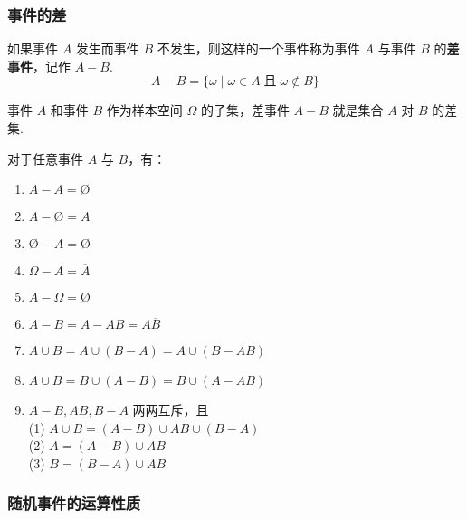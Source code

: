 \subsubsection{事件的差}

如果事件 $A$ 发生而事件 $B$ 不发生，则这样的一个事件称为事件 $A$ 与事件 $B$ 的\textbf{差事件}，记作 $A-B$.
$$
A - B = \{ \omega \mid \omega \in A \;\text{且}\; \omega \notin B \}
$$

事件 $A$ 和事件 $B$ 作为样本空间 $\varOmega$ 的子集，差事件 $A - B$ 就是集合 $A$ 对 $B$ 的差集.

\begin{property}
    \indent 对于任意事件 $A$ 与 $B$，有：
    \begin{enumerate}
        \item $A - A = \text{\O}$
        \item $A - \text{\O} = A$
        \item $\text{\O} - A = \text{\O}$
        \item $\varOmega - A = \overline{A}$
        \item $A - \varOmega = \text{\O}$
        \item $A - B = A - AB = A \overline{B}$
        \item $A \cup B = A \cup (B-A) = A \cup (B-AB)$
        \item $A \cup B = B \cup (A-B) = B \cup (A-AB)$
        \item $A-B, AB, B-A$ 两两互斥，且 \\
        (1) $A \cup B = (A-B) \cup AB \cup (B-A)$ \\
        (2) $A = (A-B) \cup AB$ \\
        (3) $B = (B-A) \cup AB$
    \end{enumerate}
\end{property}

\subsubsection{随机事件的运算性质}

